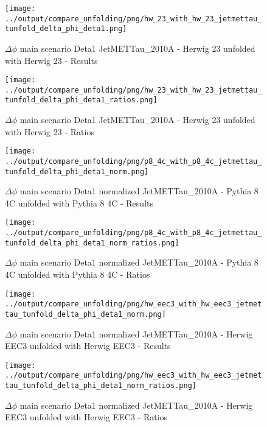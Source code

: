 \documentclass[11pt]{book}
\begin{document}
\begin{figure}[ht]
\centering
\texttt{[image: ../output/compare\_unfolding/png/hw\_23\_with\_hw\_23\_jetmettau\_tunfold\_delta\_phi\_deta1.png]}
\caption{$\Delta\phi$ main scenario Deta1 JetMETTau\_2010A - Herwig 23 unfolded with Herwig 23 - Results}
\label{hw_23_hw_23_jetmettau_tunfold_delta_phi_deta1_a}
\end{figure}

\begin{figure}[ht]
\centering
\texttt{[image: ../output/compare\_unfolding/png/hw\_23\_with\_hw\_23\_jetmettau\_tunfold\_delta\_phi\_deta1\_ratios.png]}
\caption{$\Delta\phi$ main scenario Deta1 JetMETTau\_2010A - Herwig 23 unfolded with Herwig 23 - Ratios}
\label{hw_23_hw_23_jetmettau_tunfold_delta_phi_deta1_b}
\end{figure}


\begin{figure}[ht]
\centering
\texttt{[image: ../output/compare\_unfolding/png/p8\_4c\_with\_p8\_4c\_jetmettau\_tunfold\_delta\_phi\_deta1\_norm.png]}
\caption{$\Delta\phi$ main scenario Deta1 normalized JetMETTau\_2010A - Pythia 8 4C unfolded with Pythia 8 4C - Results}
\label{p8_p8_jetmettau_tunfold_delta_phi_deta1_norm_a}
\end{figure}

\begin{figure}[ht]
\centering
\texttt{[image: ../output/compare\_unfolding/png/p8\_4c\_with\_p8\_4c\_jetmettau\_tunfold\_delta\_phi\_deta1\_norm\_ratios.png]}
\caption{$\Delta\phi$ main scenario Deta1 normalized JetMETTau\_2010A - Pythia 8 4C unfolded with Pythia 8 4C - Ratios}
\label{p8_p8_jetmettau_tunfold_delta_phi_deta1_norm_b}
\end{figure}

\begin{figure}[ht]
\centering
\texttt{[image: ../output/compare\_unfolding/png/hw\_eec3\_with\_hw\_eec3\_jetmettau\_tunfold\_delta\_phi\_deta1\_norm.png]}
\caption{$\Delta\phi$ main scenario Deta1 normalized JetMETTau\_2010A - Herwig EEC3 unfolded with Herwig EEC3 - Results}
\label{hw_eec3_hw_eec3_jetmettau_tunfold_delta_phi_deta1_norm_a}
\end{figure}

\begin{figure}[ht]
\centering
\texttt{[image: ../output/compare\_unfolding/png/hw\_eec3\_with\_hw\_eec3\_jetmettau\_tunfold\_delta\_phi\_deta1\_norm\_ratios.png]}
\caption{$\Delta\phi$ main scenario Deta1 normalized JetMETTau\_2010A - Herwig EEC3 unfolded with Herwig EEC3 - Ratios}
\label{hw_eec3_hw_eec3_jetmettau_tunfold_delta_phi_deta1_norm_b}
\end{figure}
\end{document}
